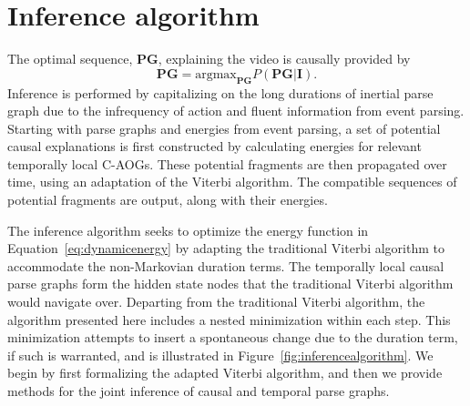 \documentclass[10pt,journal,letterpaper,compsoc]{IEEEtran}
\begin{document}
\section{Inference algorithm}




The optimal sequence, $\mathbf{PG}$, explaining the video is causally provided by 
\begin{equation}
\mathbf{PG} = \textrm{argmax}_{\mathbf{PG}} P(\mathbf{PG|I}).
\end{equation}
Inference is performed by capitalizing on the long durations of inertial parse graph due to the infrequency of action and fluent information from event parsing.  Starting with parse graphs and energies from event parsing, a set of potential causal explanations is first constructed by calculating energies for relevant temporally local C-AOGs.  These potential fragments are then propagated over time, using an adaptation of the Viterbi algorithm.  The compatible sequences of potential fragments are output, along with their energies.

The inference algorithm seeks to optimize the energy function in Equation~\ref{eq:dynamicenergy} by adapting the traditional Viterbi algorithm to accommodate the non-Markovian duration terms.  The temporally local causal parse graphs form the hidden state nodes that the traditional Viterbi algorithm would navigate over.  Departing from the traditional Viterbi algorithm, the algorithm presented here includes a nested minimization within each step.  This minimization attempts to insert a spontaneous change due to the duration term, if such is warranted, and is illustrated in Figure~\ref{fig:inferencealgorithm}.  We begin by first formalizing the adapted Viterbi algorithm, and then we provide methods for the joint inference of causal and temporal parse graphs.
\end{document}
